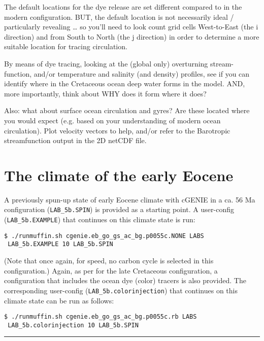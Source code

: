\documentclass[11pt,fleqn]{book} %
\begin{document}
The default locations for the dye release are set different compared to in the modern configuration. BUT, the default location is not necessarily ideal / particularly revealing … so you’ll need to look count grid cells West-to-East (the i direction) and from South to North (the j direction) in order to determine a more suitable location for tracing circulation.

By means of dye tracing, looking at the (global only) overturning stream-function, and/or temperature and salinity (and density) profiles, see if you can identify where in the Cretaceous ocean deep water forms in the model. AND, more importantly, think about WHY does it form where it does?

Also: what about surface ocean circulation and gyres? Are these located where you would expect (e.g. based on your understanding of modern ocean circulation). Plot velocity vectors to help, and/or refer to the Barotropic streamfunction output in the 2D netCDF file.

%
\newpage


\section{The climate of the early Eocene}

A previously spun-up state of early Eocene climate with cGENIE in a ca. 56 Ma configuration (\texttt{LAB\_5b.SPIN}) is provided as a starting point. A user-config (\texttt{LAB\_5b.EXAMPLE}) that continues on this climate state is run:
\begin{verbatim}
$ ./runmuffin.sh cgenie.eb_go_gs_ac_bg.p0055c.NONE LABS
 LAB_5b.EXAMPLE 10 LAB_5b.SPIN
\end{verbatim}
(Note that once again, for speed, no carbon cycle is selected in this configuration.)
Again, as per for the late Cretaceous configuration, a configuration that includes the ocean dye (color) tracers is also provided. The corresponding user-config (\texttt{LAB\_5b.colorinjection}) that continues on this climate state can be run as follows:
\begin{verbatim}
$ ./runmuffin.sh cgenie.eb_go_gs_ac_bg.p0055c.rb LABS
 LAB_5b.colorinjection 10 LAB_5b.SPIN
\end{verbatim}

\vspace{1mm}
\noindent\rule{4cm}{0.1mm}
\vspace{2mm}
\end{document}
